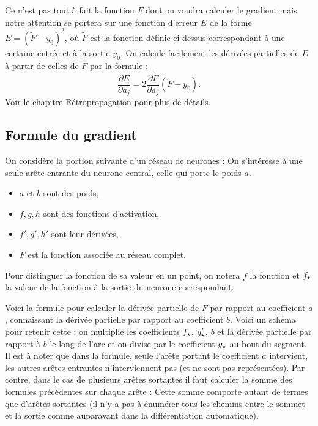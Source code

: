 {%
	Ce n'est pas tout à fait la fonction $\widetilde F$ dont on voudra calculer le gradient mais notre attention se portera sur une fonction d'erreur $E$ de la forme
	$E = (\widetilde F-y_0)^2$, où $\widetilde F$ est la fonction définie ci-dessus correspondant à une certaine entrée et à la sortie $y_0$.
	On calcule facilement les dérivées partielles de $E$ à partir de celles de $\widetilde F$ par la formule :
	$$\frac{\partial E}{\partial a_j} = 2\frac{\partial \widetilde F}{\partial a_j}(\widetilde F-y_0).$$
	Voir le chapitre \og{}Rétropropagation\fg{} pour plus de détails.


\subsection{Formule du gradient}

On considère la portion suivante d'un réseau de neurones :
On s'intéresse à une seule arête entrante du neurone central, celle qui porte le poids $a$.
\begin{itemize}
	\item $a$ et $b$ sont des poids,
	\item $f, g, h$ sont des fonctions d'activation,
	\item $f', g', h'$ sont leur dérivées,
	\item $F$ est la fonction associée au réseau complet.
\end{itemize}

Pour distinguer la fonction de sa valeur en un point, on notera $f$ la fonction et $f_\star$ la valeur de la fonction à la sortie du neurone correspondant.

Voici la formule pour calculer la dérivée partielle de $F$ par rapport au coefficient $a$, connaissant la dérivée partielle par rapport au coefficient $b$.
Voici un schéma pour retenir cette \og{}\fg{}:
on multiplie les coefficients $f_\star$, $g'_\star$, $b$ et la dérivée partielle par rapport à $b$ le long de l'arc et on divise par le coefficient $g_\star$ au bout du segment.
Il est à noter que dans la formule, seule l'arête portant le coefficient $a$ intervient, les autres arêtes entrantes n'interviennent pas (et ne sont pas représentées). 
Par contre, dans le cas de plusieurs arêtes sortantes il faut calculer la somme 
des formules précédentes sur chaque arête :
Cette somme comporte autant de termes que d'arêtes sortantes (il n'y a pas à énumérer tous les chemins entre le sommet et la sortie comme auparavant dans la différentiation automatique).

}
